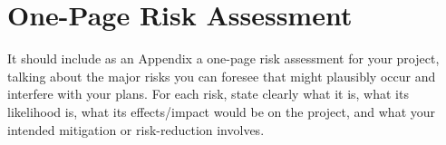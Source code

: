 \documentclass[ %
                    author={James Stephenson},
                supervisor={Dr. Edwin Simpson},
                    degree={MSc},
                     title={Project Plan: Bayesian Deep Learning For Extractive Test Summarisation},
                  subtitle={},
                      type={},
                      year={2022}]{../additions/dissertation}
\begin{document}
	\chapter{One-Page Risk Assessment}
		\label{appx:riskassessment}
		
		It should include as an Appendix a one-page risk assessment for your project, talking about the major risks you can foresee that might plausibly occur and interfere with your plans. For each risk, state clearly what it is, what its likelihood is, what its effects/impact would be on the project, and what your intended mitigation or risk-reduction involves.
		
\end{document}
